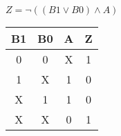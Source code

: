 
\begin{center}
    {\(Z = \lnot ((B1 \lor B0) \land A) \)}
    \begin{table}[h] %
        \begin{center}
            \begin{tabular}{|c|c|c||c|} \hline
            B1 & B0 & A & Z \\ \hline\hline
            0  & 0  & X & 1 \\ \hline
            1  & X  & 1 & 0 \\ \hline
            X  & 1  & 1 & 0 \\ \hline
            X  & X  & 0 & 1 \\ \hline
            \end{tabular}
        \end{center}
    \end{table}
\end{center}
